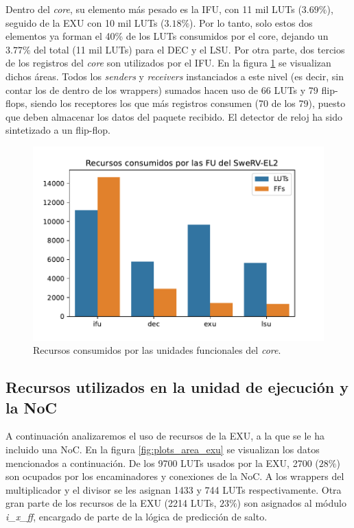 Dentro del \textit{core}, su elemento más pesado es la IFU, con 11 mil LUTs ($3.69\%$), seguido de la EXU con 10 mil LUTs ($3.18\%$). Por lo tanto, solo estos dos elementos ya forman el 40\% de los LUTs consumidos por el core, dejando un $3.77\%$ del total (11 mil LUTs) para el DEC y el LSU. Por otra parte, dos tercios de los registros del \textit{core} son utilizados por el IFU. En la figura \ref{fig:plots_area_core} se visualizan dichos áreas. Todos los \textit{senders} y \textit{receivers} instanciados a este nivel (es decir, sin contar los de dentro de los wrappers) sumados hacen uso de 66 LUTs y 79 flip-flops, siendo los receptores los que más registros consumen (70 de los 79), puesto que deben almacenar los datos del paquete recibido. El detector de reloj ha sido sintetizado a un flip-flop.
\begin{figure}[h]
    \centering
    \includegraphics[width=12cm]{images/plots/swerv_fu.pdf}
    \caption[Recursos consumidos por las unidades funcionales del \textit{core}.]{Recursos consumidos por las unidades funcionales del \textit{core}.}
    \label{fig:plots_area_core}
\end{figure}

\subsection{Recursos utilizados en la unidad de ejecución y la NoC}
A continuación analizaremos el uso de recursos de la EXU, a la que se le ha incluido una NoC. 
En la figura \ref{fig:plots_area_exu} se visualizan los datos mencionados a continuación.
De los 9700 LUTs usados por la EXU, 2700 ($28\%$) son ocupados por los encaminadores y conexiones de la NoC. A los wrappers del multiplicador y el divisor se les asignan 1433 y 744 LUTs respectivamente. Otra gran parte de los recursos de la EXU (2214 LUTs, $23\%$) son asignados al módulo \textit{i\_x\_ff}, encargado de parte de la lógica de predicción de salto.

